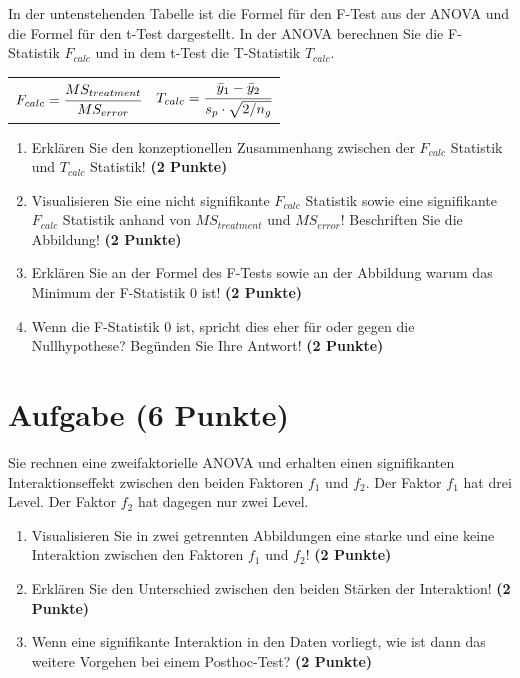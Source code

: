 \documentclass[a4paper, 10pt]{scrartcl}\usepackage[]{graphicx}\usepackage[]{xcolor}
\begin{document}
In der untenstehenden Tabelle ist die Formel f{\"u}r den F-Test aus der ANOVA
und die Formel f{\"u}r den t-Test dargestellt. In der ANOVA berechnen Sie die
F-Statistik  $F_{calc}$ und in dem t-Test die T-Statistik  $T_{calc}$.

\begin{center}
  \begin{tabular}{cc}
    $F_{calc} = \cfrac{MS_{treatment}}{MS_{error}}$ & $T_{calc} = \cfrac{\bar{y}_1 - \bar{y}_2}{s_p \cdot \sqrt{2/n_g}}$\\
  \end{tabular}
\end{center}


\begin{enumerate}
\item Erkl{\"a}ren Sie den konzeptionellen Zusammenhang zwischen der $F_{calc}$
  Statistik und $T_{calc}$ Statistik! \textbf{(2 Punkte)}
\item Visualisieren Sie eine nicht signifikante $F_{calc}$ Statistik sowie
  eine signifikante $F_{calc}$ Statistik anhand von $MS_{treatment}$ und
  $MS_{error}$! Beschriften Sie die Abbildung! \textbf{(2 Punkte)}
\item Erkl{\"a}ren Sie an der Formel des F-Tests sowie an der Abbildung warum
  das Minimum der F-Statistik 0 ist! \textbf{(2 Punkte)}
\item Wenn die F-Statistik 0 ist, spricht dies eher f{\"u}r oder gegen die
  Nullhypothese? Beg{\"u}nden Sie Ihre Antwort! \textbf{(2 Punkte)}
\end{enumerate}

 
\clearpage

\section{Aufgabe \hfill (6 Punkte)}

Sie rechnen eine zweifaktorielle ANOVA und erhalten einen signifikanten
Interaktionseffekt zwischen den beiden Faktoren $f_1$ und $f_2$. Der Faktor
$f_1$ hat drei Level. Der Faktor $f_2$ hat dagegen nur zwei Level.




\begin{enumerate}
\item Visualisieren Sie in zwei getrennten Abbildungen eine
  starke und eine keine Interaktion zwischen
  den Faktoren $f_1$ und $f_2$! \textbf{(2 Punkte)}
\item Erkl{\"a}ren Sie den Unterschied zwischen den beiden St{\"a}rken der Interaktion!
  \textbf{(2 Punkte)}
\item Wenn eine signifikante Interaktion in den Daten vorliegt, wie ist
  dann das weitere Vorgehen bei einem Posthoc-Test?
  \textbf{(2 Punkte)}
\end{enumerate}
\end{document}
